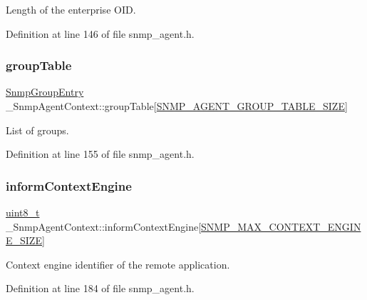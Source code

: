 Length of the enterprise O\+ID. 



Definition at line 146 of file snmp\+\_\+agent.\+h.

\mbox{\label{struct__SnmpAgentContext_ae50091d42d74d105d77924e5c1e6a3df}} 
\subsubsection{\texorpdfstring{group\+Table}{groupTable}}
{\footnotesize\ttfamily \hyperlink{structSnmpGroupEntry}{Snmp\+Group\+Entry} \+\_\+\+Snmp\+Agent\+Context\+::group\+Table\mbox{[}\hyperlink{snmp__agent_8h_a51c46973cabcfc46d84b0dbeb9365752}{S\+N\+M\+P\+\_\+\+A\+G\+E\+N\+T\+\_\+\+G\+R\+O\+U\+P\+\_\+\+T\+A\+B\+L\+E\+\_\+\+S\+I\+ZE}\mbox{]}}



List of groups. 



Definition at line 155 of file snmp\+\_\+agent.\+h.

\mbox{\label{struct__SnmpAgentContext_a2c656a5f4fa44f8f617de8dcbaa3e322}} 
\subsubsection{\texorpdfstring{inform\+Context\+Engine}{informContextEngine}}
{\footnotesize\ttfamily \hyperlink{stdint_8h_aba7bc1797add20fe3efdf37ced1182c5}{uint8\+\_\+t} \+\_\+\+Snmp\+Agent\+Context\+::inform\+Context\+Engine\mbox{[}\hyperlink{snmp__common_8h_a182f7381f1e0c29ee196042008e380be}{S\+N\+M\+P\+\_\+\+M\+A\+X\+\_\+\+C\+O\+N\+T\+E\+X\+T\+\_\+\+E\+N\+G\+I\+N\+E\+\_\+\+S\+I\+ZE}\mbox{]}}



Context engine identifier of the remote application. 



Definition at line 184 of file snmp\+\_\+agent.\+h.

\mbox{\label{struct__SnmpAgentContext_ad337880b411ff4a9cf9e194f003ca3cf}} 
